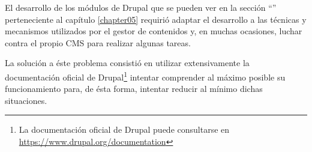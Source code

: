 		El desarrollo de los módulos de Drupal que se pueden ver en la sección ``'' perteneciente al capítulo \ref{chapter05} requirió adaptar el desarrollo a las técnicas y mecanismos utilizados por el gestor de contenidos y, en muchas ocasiones, luchar contra el propio CMS para realizar algunas tareas.
		
		La solución a éste problema consistió en utilizar extensivamente la documentación oficial de Drupal\footnote{La documentación oficial de Drupal puede consultarse en \url{https://www.drupal.org/documentation}} intentar comprender al máximo posible su funcionamiento para, de ésta forma, intentar reducir al mínimo dichas situaciones.

